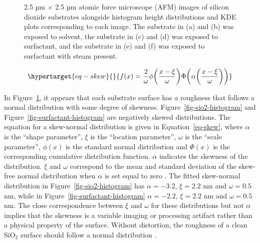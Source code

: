 \documentclass[
  a4paper,
]{scrbook}
\begin{document}
\begin{figure}
\begin{minipage}[t]{0.47\linewidth}
{{}

}

\subcaption{\label{fig-steamed-surfactant-histogram}}
\end{minipage}%

\caption{\label{fig-afm-substrate}2.5 µm \(\times\) 2.5 µm atomic force
microscope (AFM) images of silicon dioxide substrates alongside
histogram height distributions and KDE plots corresponding to each
image. The substrate in (a) and (b) was exposed to solvent, the
substrate in (c) and (d) was exposed to surfactant, and the substrate in
(e) and (f) was exposed to surfactant with steam present.}

\end{figure}

\begin{equation}\protect\hypertarget{eq-skew}{}{
f(x) = \frac{2}{\omega}\phi\bigg(\frac{x-\xi}{\omega}\bigg)\Phi\bigg(\alpha\bigg(\frac{x-\xi}{\omega}\bigg)\bigg)
}\label{eq-skew}\end{equation}

In Figure~\ref{fig-afm-substrate}, it appears that each substrate
surface has a roughness that follows a normal distribution with some
degree of skewness. Figure~\ref{fig-sio2-histogram} and
Figure~\ref{fig-surfactant-histogram} are negatively skewed
distributions. The equation for a skew-normal distribution is given in
Equation~\ref{eq-skew}, where \(\alpha\) is the ``shape parameter'',
\(\xi\) is the ``location parameter'', \(\omega\) is the ``scale
parameter'', \(\phi(x)\) is the standard normal distribution and
\(\Phi(x)\) is the corresponding cumulative distribution function.
\(\alpha\) indicates the skewness of the distribution. \(\xi\) and
\(\omega\) correspond to the mean and standard deviation of the
skew-free normal distribution when \(\alpha\) is set equal to zero
\autocite{Azzalini1999}. The fitted skew-normal distribution in
Figure~\ref{fig-sio2-histogram} has \(\alpha = -3.2\), \(\xi = 2.2\) nm
and \(\omega = 0.5\) nm, while in Figure~\ref{fig-surfactant-histogram}
\(\alpha = -2.2\), \(\xi = 2.2\) nm and \(\omega = 0.5\) nm. The close
correspondence between \(\xi\) and \(\omega\) for these distributions
but not \(\alpha\) implies that the skewness is a variable imaging or
processing artifact rather than a physical property of the surface.
Without distortion, the roughness of a clean SiO\(_2\) surface should
follow a normal distribution \autocite{Velicky2015}.
\end{document}
